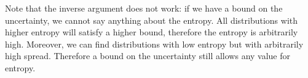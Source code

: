 \documentclass[10pt,twocolumn, nofootinbib]{revtex4-2}
\begin{document}
\begin{remark}
	Note that the inverse argument does not work: if we have a bound on the uncertainty, we cannot say anything about the entropy. All distributions with higher entropy will satisfy a higher bound, therefore the entropy is arbitrarily high. Moreover, we can find distributions with low entropy but with arbitrarily high spread. Therefore a bound on the uncertainty still allows any value for entropy.
\end{remark}


\end{document}
